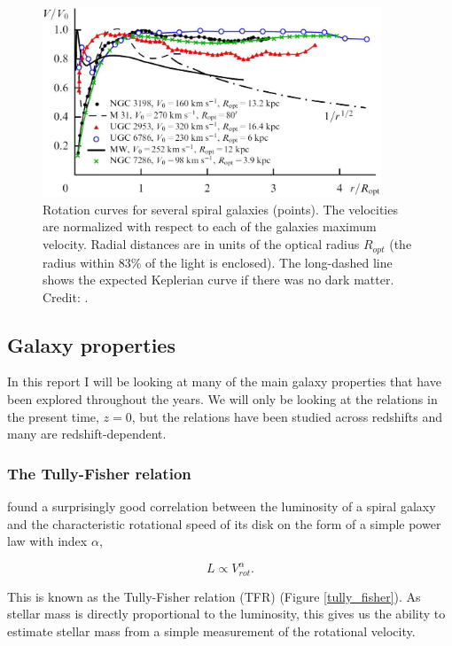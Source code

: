\begin{figure}
    \centering
    \includegraphics[width=0.9\textwidth]{images/rotation_curves.png}
    \caption{Rotation curves for several spiral galaxies (points). The velocities are normalized with respect to each of the galaxies maximum velocity. Radial distances are in units of the optical radius $R_{opt}$ (the radius within 83\% of the light is enclosed). The long-dashed line shows the expected Keplerian curve if there was no dark matter. Credit: \textcite{Zasov2017}.}
    \label{rotation_curves}
\end{figure}

\subsection{Galaxy properties}
In this report I will be looking at many of the main galaxy properties that have been explored throughout the years. We will only be looking at the relations in the present time, $z=0$, but the relations have been studied across redshifts and many are redshift-dependent.

\subsubsection{The Tully-Fisher relation}

\textcite{TullyFisher1977} found a surprisingly good correlation between the luminosity of a spiral galaxy and the characteristic rotational speed of its disk on the form of a simple power law with index $\alpha$,

\begin{equation}
    L \propto V_{rot}^\alpha.
\end{equation}

This is known as the Tully-Fisher relation (TFR) (Figure \ref{tully_fisher}). As stellar mass is directly proportional to the luminosity, this gives us the ability to estimate stellar mass from a simple measurement of the rotational velocity.


